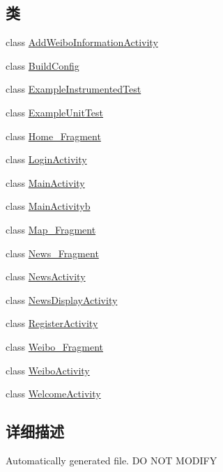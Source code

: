 \subsection*{类}
\begin{DoxyCompactItemize}
\item 
class \mbox{\hyperlink{classcom_1_1example_1_1akisame__lin_1_1love__air2_1_1_add_weibo_information_activity}{Add\+Weibo\+Information\+Activity}}
\item 
class \mbox{\hyperlink{classcom_1_1example_1_1akisame__lin_1_1love__air2_1_1_build_config}{Build\+Config}}
\item 
class \mbox{\hyperlink{classcom_1_1example_1_1akisame__lin_1_1love__air2_1_1_example_instrumented_test}{Example\+Instrumented\+Test}}
\item 
class \mbox{\hyperlink{classcom_1_1example_1_1akisame__lin_1_1love__air2_1_1_example_unit_test}{Example\+Unit\+Test}}
\item 
class \mbox{\hyperlink{classcom_1_1example_1_1akisame__lin_1_1love__air2_1_1_home___fragment}{Home\+\_\+\+Fragment}}
\item 
class \mbox{\hyperlink{classcom_1_1example_1_1akisame__lin_1_1love__air2_1_1_login_activity}{Login\+Activity}}
\item 
class \mbox{\hyperlink{classcom_1_1example_1_1akisame__lin_1_1love__air2_1_1_main_activity}{Main\+Activity}}
\item 
class \mbox{\hyperlink{classcom_1_1example_1_1akisame__lin_1_1love__air2_1_1_main_activityb}{Main\+Activityb}}
\item 
class \mbox{\hyperlink{classcom_1_1example_1_1akisame__lin_1_1love__air2_1_1_map___fragment}{Map\+\_\+\+Fragment}}
\item 
class \mbox{\hyperlink{classcom_1_1example_1_1akisame__lin_1_1love__air2_1_1_news___fragment}{News\+\_\+\+Fragment}}
\item 
class \mbox{\hyperlink{classcom_1_1example_1_1akisame__lin_1_1love__air2_1_1_news_activity}{News\+Activity}}
\item 
class \mbox{\hyperlink{classcom_1_1example_1_1akisame__lin_1_1love__air2_1_1_news_display_activity}{News\+Display\+Activity}}
\item 
class \mbox{\hyperlink{classcom_1_1example_1_1akisame__lin_1_1love__air2_1_1_register_activity}{Register\+Activity}}
\item 
class \mbox{\hyperlink{classcom_1_1example_1_1akisame__lin_1_1love__air2_1_1_weibo___fragment}{Weibo\+\_\+\+Fragment}}
\item 
class \mbox{\hyperlink{classcom_1_1example_1_1akisame__lin_1_1love__air2_1_1_weibo_activity}{Weibo\+Activity}}
\item 
class \mbox{\hyperlink{classcom_1_1example_1_1akisame__lin_1_1love__air2_1_1_welcome_activity}{Welcome\+Activity}}
\end{DoxyCompactItemize}


\subsection{详细描述}
Automatically generated file. DO N\+OT M\+O\+D\+I\+FY 